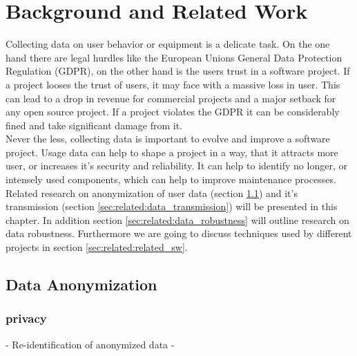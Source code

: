 \chapter{Background and Related Work}
\label{chap:related_work}
%
Collecting data on user behavior or equipment is a delicate task. On the one hand there are legal hurdles like
the European Unions General Data Protection Regulation (GDPR), on the other hand is the users trust
in a software project. If a project looses the trust of users, it may face with a massive loss in
user. This can lead to a drop in revenue for commercial projects and a major setback for any open source
project. If a project violates the GDPR it can be considerably fined and take significant damage from it.\\

Never the less, collecting data is important to evolve and improve a software project. Usage data can help
to shape a project in a way, that it attracts more user, or increases it's security and reliability.
It can help to identify no longer, or intensely used components, which can help to improve maintenance
processes.\\ 


Related research on anonymization of user data 
(section \ref{sec:related:data_aononymization}) and it's transmission (section \ref{sec:related:data_transmission}) will be presented in this chapter. In addition section \ref{sec:related:data_robustness} will outline research on data robustness.
Furthermore we are going to discuss techniques used by different projects in section \ref{sec:related:related_sw}. 


\section{Data Anonymization}
    \label{sec:related:data_aononymization}
    
    \subsection{privacy}
    - Re-identification of anonymized data
    -

